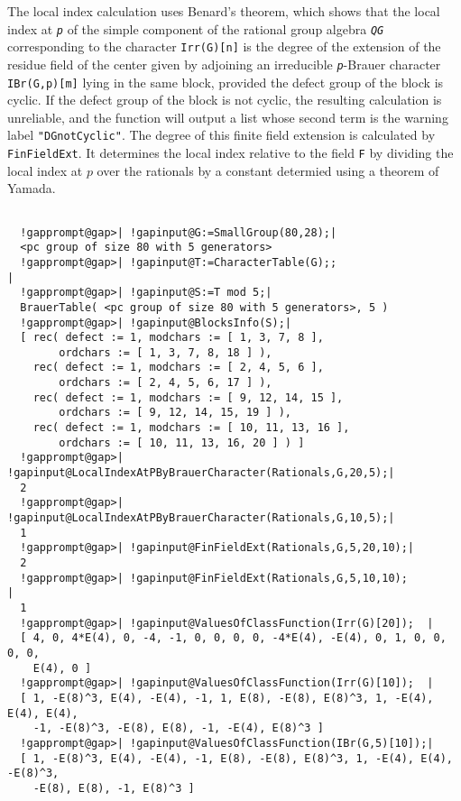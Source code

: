\documentclass[a4paper,11pt]{report}
\begin{document}
{{{ The local index calculation uses Benard's theorem, which shows that the local
index at \mbox{\texttt{\mdseries\slshape p}} of the simple component of the rational group algebra \mbox{\texttt{\mdseries\slshape QG}} corresponding to the character \texttt{Irr(G)[n]} is the degree of the extension of the residue field of the center given by
adjoining an irreducible \mbox{\texttt{\mdseries\slshape p}}-Brauer character \texttt{IBr(G,p)[m]} lying in the same block, provided the defect group of the block is cyclic. If
the defect group of the block is not cyclic, the resulting calculation is
unreliable, and the function will output a list whose second term is the
warning label \texttt{"DGnotCyclic"}. The degree of this finite field extension is calculated by \texttt{FinFieldExt}. It determines the local index relative to the field \texttt{F} by dividing the local index at $p$ over the rationals by a constant determied using a theorem of Yamada. 

 
\begin{Verbatim}[commandchars=!@|,fontsize=\small,frame=single,label=Example]
  
  !gapprompt@gap>| !gapinput@G:=SmallGroup(80,28);|
  <pc group of size 80 with 5 generators>
  !gapprompt@gap>| !gapinput@T:=CharacterTable(G);;                                         |
  !gapprompt@gap>| !gapinput@S:=T mod 5;|
  BrauerTable( <pc group of size 80 with 5 generators>, 5 )
  !gapprompt@gap>| !gapinput@BlocksInfo(S);|
  [ rec( defect := 1, modchars := [ 1, 3, 7, 8 ], 
        ordchars := [ 1, 3, 7, 8, 18 ] ), 
    rec( defect := 1, modchars := [ 2, 4, 5, 6 ], 
        ordchars := [ 2, 4, 5, 6, 17 ] ), 
    rec( defect := 1, modchars := [ 9, 12, 14, 15 ], 
        ordchars := [ 9, 12, 14, 15, 19 ] ), 
    rec( defect := 1, modchars := [ 10, 11, 13, 16 ], 
        ordchars := [ 10, 11, 13, 16, 20 ] ) ]
  !gapprompt@gap>| !gapinput@LocalIndexAtPByBrauerCharacter(Rationals,G,20,5);|
  2
  !gapprompt@gap>| !gapinput@LocalIndexAtPByBrauerCharacter(Rationals,G,10,5);|
  1
  !gapprompt@gap>| !gapinput@FinFieldExt(Rationals,G,5,20,10);|
  2
  !gapprompt@gap>| !gapinput@FinFieldExt(Rationals,G,5,10,10);                |
  1
  !gapprompt@gap>| !gapinput@ValuesOfClassFunction(Irr(G)[20]);  |
  [ 4, 0, 4*E(4), 0, -4, -1, 0, 0, 0, 0, -4*E(4), -E(4), 0, 1, 0, 0, 0, 0, 
    E(4), 0 ]
  !gapprompt@gap>| !gapinput@ValuesOfClassFunction(Irr(G)[10]);  |
  [ 1, -E(8)^3, E(4), -E(4), -1, 1, E(8), -E(8), E(8)^3, 1, -E(4), E(4), E(4), 
    -1, -E(8)^3, -E(8), E(8), -1, -E(4), E(8)^3 ]
  !gapprompt@gap>| !gapinput@ValuesOfClassFunction(IBr(G,5)[10]);|
  [ 1, -E(8)^3, E(4), -E(4), -1, E(8), -E(8), E(8)^3, 1, -E(4), E(4), -E(8)^3, 
    -E(8), E(8), -1, E(8)^3 ]
  

\end{Verbatim}}}}
\end{document}
